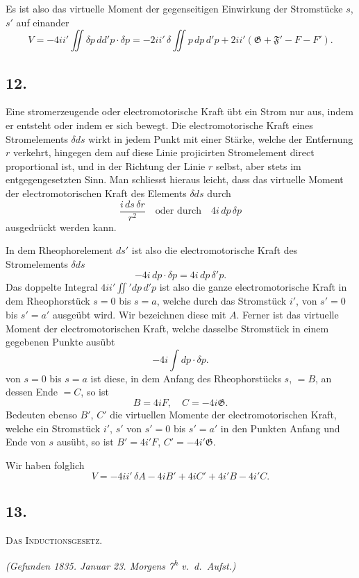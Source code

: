 \documentclass[fontsize=10pt,paper=a5,pagesize=auto]{scrbook}
\newcommand{\origpage}[1]{\marginpar{\footnotesize\textit{S. #1}}}
\begin{document}
Es ist also das virtuelle Moment der gegenseitigen Einwirkung der Stromstücke $s$, $s'$ auf einander
\[
V = -4ii' \iint \delta p \, dd'p \cdot \delta p = -2ii' \, \delta \iint p \, dp \, d'p + 2ii'(\mathfrak{G} + \mathfrak{F}' - F - F').
\]

\subsection*{12.}
\origpage{610}
Eine stromerzeugende oder electromotorische Kraft übt ein Strom nur aus, indem er entsteht oder indem er sich bewegt. Die electromotorische Kraft eines Stromelements $\delta ds$ wirkt in jedem Punkt mit einer Stärke, welche der Entfernung $r$ verkehrt, hingegen dem auf diese Linie projicirten Stromelement direct proportional ist, und in der Richtung der Linie $r$ selbst, aber stets im entgegengesetzten Sinn. Man schliesst hieraus leicht, dass das virtuelle Moment der electromotorischen Kraft des Elements $\delta ds$ durch
\[
\frac{i \, ds \, \delta r}{r^2} \quad \text{oder durch} \quad 4i \, dp \, \delta p
\]
ausgedrückt werden kann.

\origpage{611}
In dem Rheophorelement $ds'$ ist also die electromotorische Kraft des Stromelements $\delta ds$
\[
-4i \, dp \cdot \delta p = 4i \, dp \, \delta' p.
\]
Das doppelte Integral $4ii' \iint' dp \, d'p$ ist also die ganze electromotorische Kraft in dem Rheophorstück $s = 0$ bis $s = a$, welche durch das Stromstück $i'$, von $s' = 0$ bis $s' = a'$ ausgeübt wird. Wir bezeichnen diese mit $A$. Ferner ist das virtuelle Moment der electromotorischen Kraft, welche dasselbe Stromstück in einem gegebenen Punkte ausübt
\[
-4i \int dp \cdot \delta p.
\]
von $s = 0$ bis $s = a$ ist diese, in dem Anfang des Rheophorstücks $s$, $= B$, an dessen Ende $= C$, so ist
\[
B = 4iF, \quad C = -4i\mathfrak{G}.
\]
Bedeuten ebenso $B'$, $C'$ die virtuellen Momente der electromotorischen Kraft, welche ein Stromstück $i'$, $s'$ von $s' = 0$ bis $s' = a'$ in den Punkten Anfang und Ende von $s$ ausübt, so ist $B' = 4i'F$, $C' = -4i'\mathfrak{G}$.

Wir haben folglich
\[
V = -4ii' \, \delta A - 4iB' + 4iC' + 4i'B - 4i'C.
\]

\subsection*{13.}
\origpage{611}
\textsc{Das Inductionsgesetz.}

\begin{otherlanguage}{ngerman}
\textit{(Gefunden 1835. Januar 23. Morgens 7\textsuperscript{h} v.~d.~Aufst.)}
\end{otherlanguage}
\end{document}
